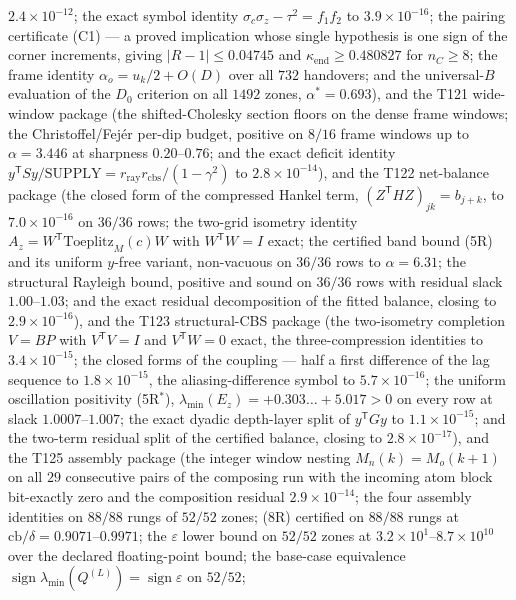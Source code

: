 \documentclass[11pt,a4paper]{article}
\begin{document}
\begin{keybox}
$2.4\times10^{-12}$; the exact symbol identity $\sigma_c\sigma_z-\tau^2=f_1f_2$ to
$3.9\times10^{-16}$; the pairing certificate (C1) --- a proved implication whose single
hypothesis is one sign of the corner increments, giving $|R-1|\le0.04745$ and
$\kappa_{\mathrm{end}}\ge0.480827$ for $n_C\ge8$; the frame identity
$\alpha_o=u_k/2+O(D)$ over all $732$ handovers; and the universal-$B$ evaluation of the
$D_0$ criterion on all $1492$ zones, $\alpha^*=0.693$), and the T121 wide-window package
(the shifted-Cholesky section floors on the dense frame windows; the Christoffel/Fej\'er
per-dip budget, positive on $8/16$ frame windows up to $\alpha=3.446$ at sharpness
$0.20$--$0.76$; and the exact deficit identity
$y^{\mathsf T}Sy/\mathrm{SUPPLY}=r_{\mathrm{ray}}r_{\mathrm{cbs}}/(1-\gamma^2)$ to
$2.8\times10^{-14}$), and the T122 net-balance package (the closed form of the compressed
Hankel term, $(Z^{\mathsf T}HZ)_{jk}=b_{j+k}$, to $7.0\times10^{-16}$ on $36/36$ rows; the
two-grid isometry identity $A_z=W^{\mathsf T}\mathrm{Toeplitz}_M(c)W$ with $W^{\mathsf T}W=I$
exact; the certified band bound (5R) and its uniform $y$-free variant, non-vacuous on $36/36$
rows to $\alpha=6.31$; the structural Rayleigh bound, positive and sound on $36/36$ rows with
residual slack $1.00$--$1.03$; and the exact residual decomposition of the fitted balance,
closing to $2.9\times10^{-16}$), and the T123 structural-CBS package (the two-isometry
completion $V=BP$ with $V^{\mathsf T}V=I$ and $V^{\mathsf T}W=0$ exact, the three-compression
identities to $3.4\times10^{-15}$; the closed forms of the coupling --- half a first
difference of the lag sequence to $1.8\times10^{-15}$, the aliasing-difference symbol to
$5.7\times10^{-16}$; the uniform oscillation positivity (5R$^*$),
$\lambda_{\min}(E_z)=+0.303\ldots+5.017>0$ on every row at slack $1.0007$--$1.007$; the exact
dyadic depth-layer split of $y^{\mathsf T}Gy$ to $1.1\times10^{-15}$; and the two-term
residual split of the certified balance, closing to $2.8\times10^{-17}$), and the T125 assembly
package (the integer window nesting $M_n(k)=M_o(k+1)$ on all $29$ consecutive pairs of the composing
run with the incoming atom block bit-exactly zero and the composition residual $2.9\times10^{-14}$;
the four assembly identities on $88/88$ rungs of $52/52$ zones; (8R) certified on $88/88$ rungs at
$\mathrm{cb}/\delta=0.9071$--$0.9971$; the $\varepsilon$ lower bound on $52/52$ zones at
$3.2\times10^{1}$--$8.7\times10^{10}$ over the declared floating-point bound; the base-case
equivalence $\operatorname{sign}\lambda_{\min}(Q^{(L)})=\operatorname{sign}\varepsilon$ on $52/52$;

\end{keybox}
\end{document}
